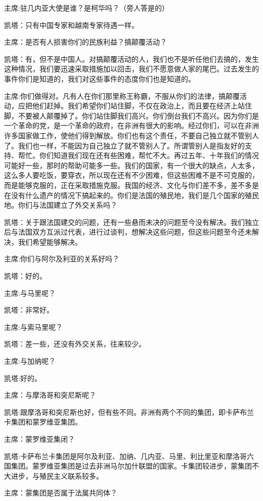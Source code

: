 主席:驻几内亚大使是谁？是柯华吗？（旁人答是的）

凯塔：只有中国专家和越南专家待遇一样。

主席：是否有人损害你们的民族利益？搞颠覆活动？

凯塔：有，但不是中国人。对搞颠覆活动的人，我们也不是听任他们去搞的，发生这种情况，我们要迅速采取措施加以回击，我们不愿意做人家的尾巴。过去发生的事件你们是知道的，我们对这些事件的态度你们也是知道的。

主席:你们做得对。凡有人在你们那里称王称霸，不服从你们的法律，搞颠覆活动，应把他们赶掉。我们希望你们站住脚，不仅在政治上，而且要在经济上站住脚，不要被人颠覆掉了。你们站住脚我们高兴。你们倒台我们不高兴。因为你们是一个革命的党，是一个革命的政府，在非洲有很大的影响。经过你们，可以在非洲许多国家做工作，使他们得到解放。你们也有这个责任，不要自己独立就不管别人了。我们也一样，不能因为自己独立了就不管别人了。所谓管别人是指友好的支持、帮忙。你们知道我们现在还有些困难，帮忙不大。再过五年、十年我们的情况可能好一些，那时的帮助可能多一些。我们的国家，有一个很大的缺点，人太多，这么多人要吃饭，要穿衣，所以现在还有不少困难，但这些困难不是不可克服的，而是能够克服的，正在采取措施克服。我国的经济、文化与你们差不多，差不多是在没有什么遗产的情况下搞起来的。你们是法国的殖民地，我们是几个国家的殖民地。你们与法国建立了外交关系吗？

凯塔：关于跟法国建交的问题，还有一些悬而未决的问题至今没有解决。我们独立后与法国双方互派过代表，进行过谈判，想解决这些问题，但这些问题至今还未解决，我们希望能够解决。

主席:你们与阿尔及利亚的关系好吗？

凯塔：好的。

主席:与马里呢？

凯塔：非常好。

主席:与索马里呢？

凯塔：差一些，还没有外交关系，往来较少。

主席:与加纳呢？

凯塔:好的。

主席：与摩洛哥和突尼斯呢？

凯塔:跟摩洛哥和突尼斯也好，但有些不同。非洲有两个不同的集团，即卡萨布兰卡集团和蒙罗维亚集团。

主席：蒙罗维亚集闭？

凯塔:卡萨布兰卡集团是阿尔及利亚、加纳、几内亚、马里、利比里亚和摩洛哥六国集团。蒙罗维亚集团是过去非洲马尔加什联盟的国家。卡集团较进步，蒙集团不大进步，与殖民主义联系较多。

主席：蒙集团是否属于法属共同体？


